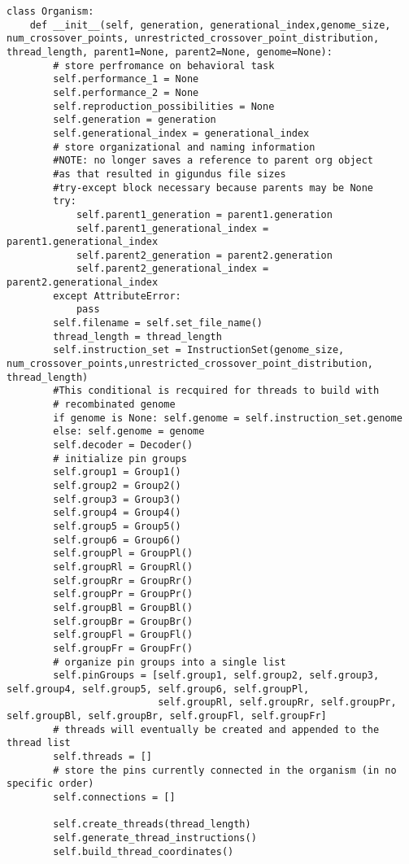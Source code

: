 \documentclass[a4paper]{article}
\begin{document}
\begin{verbatim}
class Organism:
    def __init__(self, generation, generational_index,genome_size, num_crossover_points, unrestricted_crossover_point_distribution, thread_length, parent1=None, parent2=None, genome=None):
        # store perfromance on behavioral task
        self.performance_1 = None
        self.performance_2 = None
        self.reproduction_possibilities = None
        self.generation = generation
        self.generational_index = generational_index
        # store organizational and naming information
        #NOTE: no longer saves a reference to parent org object
        #as that resulted in gigundus file sizes
        #try-except block necessary because parents may be None
        try:
            self.parent1_generation = parent1.generation
            self.parent1_generational_index = parent1.generational_index
            self.parent2_generation = parent2.generation
            self.parent2_generational_index = parent2.generational_index
        except AttributeError:
            pass
        self.filename = self.set_file_name()
        thread_length = thread_length
        self.instruction_set = InstructionSet(genome_size, num_crossover_points,unrestricted_crossover_point_distribution, thread_length)
        #This conditional is recquired for threads to build with
        # recombinated genome
        if genome is None: self.genome = self.instruction_set.genome
        else: self.genome = genome
        self.decoder = Decoder()
        # initialize pin groups
        self.group1 = Group1()
        self.group2 = Group2()
        self.group3 = Group3()
        self.group4 = Group4()
        self.group5 = Group5()
        self.group6 = Group6()
        self.groupPl = GroupPl()
        self.groupRl = GroupRl()
        self.groupRr = GroupRr()
        self.groupPr = GroupPr()
        self.groupBl = GroupBl()
        self.groupBr = GroupBr()
        self.groupFl = GroupFl()
        self.groupFr = GroupFr()
        # organize pin groups into a single list
        self.pinGroups = [self.group1, self.group2, self.group3, self.group4, self.group5, self.group6, self.groupPl,
                          self.groupRl, self.groupRr, self.groupPr, self.groupBl, self.groupBr, self.groupFl, self.groupFr]
        # threads will eventually be created and appended to the thread list
        self.threads = []
        # store the pins currently connected in the organism (in no specific order)
        self.connections = []

        self.create_threads(thread_length)
        self.generate_thread_instructions()
        self.build_thread_coordinates()
\end{verbatim}
\end{document}
